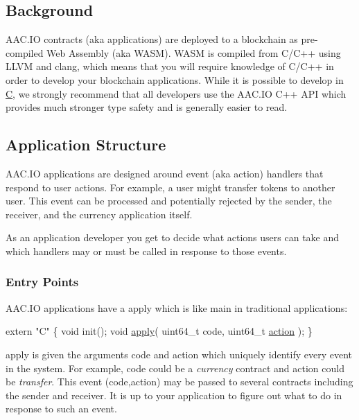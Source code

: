 \hypertarget{group__contractdev_background}{}\subsection{Background}\label{group__contractdev_background}
A\+A\+C.\+IO contracts (aka applications) are deployed to a blockchain as pre-\/compiled Web Assembly (aka W\+A\+SM). W\+A\+SM is compiled from C/\+C++ using L\+L\+VM and clang, which means that you will require knowledge of C/\+C++ in order to develop your blockchain applications. While it is possible to develop in \mbox{\hyperlink{struct_c}{C}}, we strongly recommend that all developers use the A\+A\+C.\+IO C++ A\+PI which provides much stronger type safety and is generally easier to read.\hypertarget{group__contractdev_programstructure}{}\subsection{Application Structure}\label{group__contractdev_programstructure}
A\+A\+C.\+IO applications are designed around event (aka action) handlers that respond to user actions. For example, a user might transfer tokens to another user. This event can be processed and potentially rejected by the sender, the receiver, and the currency application itself.

As an application developer you get to decide what actions users can take and which handlers may or must be called in response to those events.\hypertarget{group__contractdev_programentry}{}\subsubsection{Entry Points}\label{group__contractdev_programentry}
A\+A\+C.\+IO applications have a {\ttfamily apply} which is like {\ttfamily main} in traditional applications\+:


\begin{DoxyCode}
\textcolor{keyword}{extern} \textcolor{stringliteral}{"C"} \{
   \textcolor{keywordtype}{void} init();
   \textcolor{keywordtype}{void} \mbox{\hyperlink{aacio_8system_8cpp_abdb22838286244938c6192c2a2263d9c}{apply}}( uint64\_t code, uint64\_t \mbox{\hyperlink{structaction}{action}} );
\}
\end{DoxyCode}


{\ttfamily apply} is given the arguments {\ttfamily code} and {\ttfamily action} which uniquely identify every event in the system. For example, {\ttfamily code} could be a {\itshape currency} contract and {\ttfamily action} could be {\itshape transfer}. This event (code,action) may be passed to several contracts including the {\ttfamily sender} and {\ttfamily receiver}. It is up to your application to figure out what to do in response to such an event.

